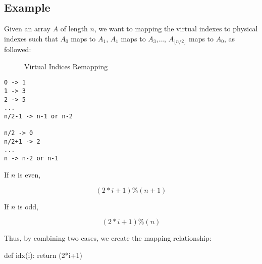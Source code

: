 \subsection{Example}
 Given an array $A$ of length $n$, we want to mapping the virtual indexes to physical indexes such that $A_0$ maps to $A_1$, $A_1$ maps to $A_3$,..., $A_{\lfloor n/2\rfloor}$ maps to $A_0$, as followed: 
\begin{figure}[hbtp]
\centering
{}
\caption{Virtual Indices Remapping}
\label{fig:virtual_indexes}
\end{figure}
\begin{lstlisting}
0 -> 1
1 -> 3
2 -> 5
...
n/2-1 -> n-1 or n-2

n/2 -> 0
n/2+1 -> 2
...
n -> n-2 or n-1
\end{lstlisting}
If $n$ is even, 

$$
(2*i+1)\%(n+1)
$$

If $n$ is odd,

$$
(2*i+1)\%(n)
$$

Thus, by combining two cases, we create the mapping relationship: 
\begin{python}
def idx(i):
    return (2*i+1) %
\end{python}

